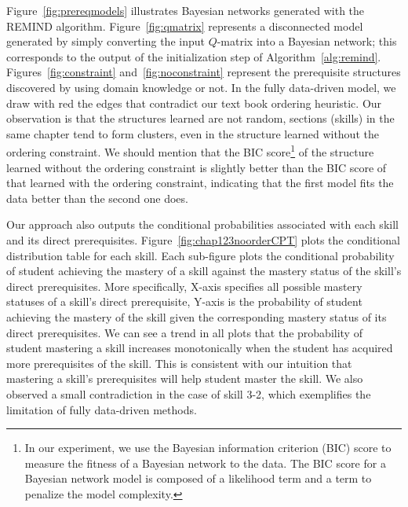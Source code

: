 \documentclass{edm_template}
\newcommand{\hl}[1]{\colorbox{yellow}{#1}}
\begin{document}
{	
	Figure~\ref{fig:prereqmodels} illustrates Bayesian networks generated with the REMIND algorithm.
	Figure~\ref{fig:qmatrix} represents a disconnected model generated by simply converting the input $Q$-matrix into a Bayesian network;
	this corresponds to the output of the initialization step of Algorithm~\ref{alg:remind}.
	Figures~\ref{fig:constraint} and~\ref{fig:noconstraint} represent the prerequisite structures discovered by using domain knowledge or not.
	In the fully data-driven model, we draw with red the edges that contradict our text book ordering heuristic.
	Our observation is that the structures learned are not random, sections (skills) in the same chapter tend to form clusters, 
	even in the structure learned without the ordering constraint.
	We should mention that the BIC score\footnote{In our experiment, we use the Bayesian information criterion (BIC) score to measure the fitness of a Bayesian network to the data. The BIC score for a Bayesian network model is composed of a likelihood term and a term to penalize the model complexity.} of the structure learned without the ordering constraint is slightly better than the BIC score of that learned with the ordering constraint, indicating that the first model fits the data better than the second one does.
	
	

	Our approach also outputs the conditional probabilities associated with each skill and its direct prerequisites.
	Figure~\ref{fig:chap123noorderCPT} plots the conditional distribution table for each skill.
	Each sub-figure plots the conditional probability of student achieving the mastery of a skill against the mastery status of the skill's direct prerequisites. 
	More specifically, X-axis specifies all possible mastery statuses of a skill's direct prerequisite, 
	Y-axis is the probability of student achieving the mastery of the skill given the corresponding mastery status of its direct prerequisites.
	We can see a trend in all plots that the probability of student mastering a skill increases monotonically when the student has acquired more prerequisites of the skill.
	This is consistent with our intuition that mastering a skill's prerequisites will help student master the skill.
	We also observed a small contradiction in the case of skill 3-2, which exemplifies the limitation of fully data-driven methods. 
	
}
\end{document}
